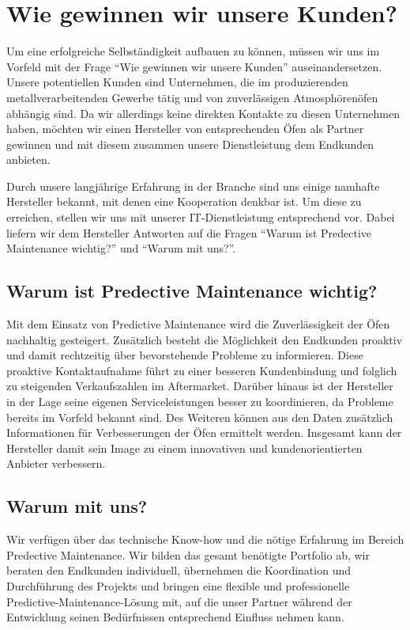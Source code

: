 \newpage
\section{Wie gewinnen wir unsere Kunden?}
Um eine erfolgreiche Selbständigkeit aufbauen zu können, müssen wir uns im Vorfeld mit der Frage “Wie gewinnen wir unsere Kunden” auseinandersetzen.
Unsere potentiellen Kunden sind Unternehmen, die im produzierenden metallverarbeitenden Gewerbe tätig und von zuverlässigen Atmosphörenöfen abhängig sind. Da wir allerdings keine direkten Kontakte zu diesen Unternehmen haben, möchten wir einen Hersteller von entsprechenden Öfen als Partner gewinnen und mit diesem zusammen unsere Dienstleistung dem Endkunden anbieten.

Durch unsere langjährige Erfahrung in der Branche sind uns einige namhafte Hersteller bekannt, mit denen eine Kooperation denkbar ist. Um diese zu erreichen, stellen wir uns mit unserer IT-Dienstleistung entsprechend vor. Dabei liefern wir dem Hersteller Antworten auf die Fragen “Warum ist Predective Maintenance wichtig?” und “Warum mit uns?”.

\subsection{Warum ist Predective Maintenance wichtig?}
Mit dem Einsatz von Predictive Maintenance wird die Zuverlässigkeit der Öfen nachhaltig gesteigert. Zusätzlich besteht die Möglichkeit den Endkunden proaktiv und damit rechtzeitig über bevorstehende Probleme zu informieren. Diese proaktive Kontaktaufnahme führt zu einer besseren Kundenbindung und folglich zu steigenden Verkaufszahlen im Aftermarket. Darüber hinaus ist der Hersteller in der Lage seine eigenen Serviceleistungen besser zu koordinieren, da Probleme bereits im Vorfeld bekannt sind. Des Weiteren können aus den Daten zusätzlich Informationen für Verbesserungen der Öfen ermittelt werden.
Insgesamt kann der Hersteller damit sein Image zu einem innovativen und kundenorientierten Anbieter verbessern.

\subsection{Warum mit uns?}
Wir verfügen über das technische Know-how und die nötige Erfahrung im Bereich Predective Maintenance. Wir bilden das gesamt benötigte Portfolio ab, wir beraten den Endkunden individuell, übernehmen die Koordination und Durchführung des Projekts und bringen eine flexible und professionelle Predictive-Maintenance-Lösung mit, auf die unser Partner während der Entwicklung seinen Bedürfnissen entsprechend Einfluss nehmen kann. 

